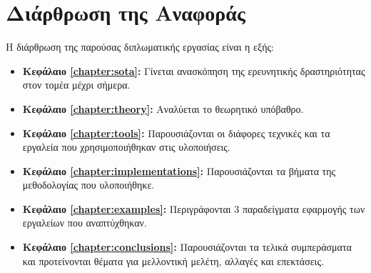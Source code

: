 \section{Διάρθρωση της Αναφοράς}
\label{section:layout}

Η διάρθρωση της παρούσας διπλωματικής εργασίας είναι η εξής:

\begin{itemize}
	\item{\textbf{Κεφάλαιο \ref{chapter:sota}:} Γίνεται ανασκόπηση της ερευνητικής δραστηριότητας στον τομέα μέχρι σήμερα.
	}
	\item{\textbf{Κεφάλαιο \ref{chapter:theory}:} Αναλύεται το θεωρητικό υπόβαθρο. 
	}
	\item{\textbf{Κεφάλαιο \ref{chapter:tools}:} Παρουσιάζονται οι διάφορες τεχνικές και τα εργαλεία που χρησιμοποιήθηκαν στις υλοποιήσεις.
	}
	\item{\textbf{Κεφάλαιο \ref{chapter:implementations}:} Παρουσιάζονται τα βήματα της μεθοδολογίας που υλοποιήθηκε.
	}
	\item{\textbf{Κεφάλαιο \ref{chapter:examples}:} Περιγράφονται 3 παραδείγματα εφαρμογής των εργαλείων που αναπτύχθηκαν.
	}
	\item{\textbf{Κεφάλαιο \ref{chapter:conclusions}:} Παρουσιάζονται τα τελικά συμπεράσματα και προτείνονται θέματα για μελλοντική μελέτη, αλλαγές και επεκτάσεις.
	}

\end{itemize}

